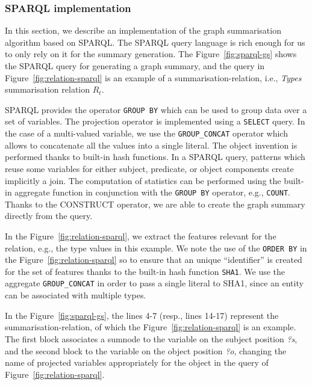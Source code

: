 \subsubsection{SPARQL implementation}

In this section, we describe an implementation of the graph summarisation algorithm based on SPARQL. The SPARQL query language is rich enough for us to only rely on it for the summary generation.
The Figure~\ref{fig:sparql-gs} shows the SPARQL query for generating a graph summary, and the query in Figure~\ref{fig:relation-sparql} is an example of a \gls{summarisation-relation}, i.e., \emph{Types} summarisation relation $R_t$.


SPARQL provides the operator \texttt{GROUP BY} which can be used to group data over a set of variables. The projection operator is implemented using a \texttt{SELECT} query. In the case of a multi-valued variable, we use the \texttt{GROUP\_CONCAT} operator which allows to concatenate all the values into a single literal. The object invention is performed thanks to built-in hash functions. In a SPARQL query, patterns which reuse some variables for either subject, predicate, or object components create implicitly a join. The computation of statistics can be performed using the built-in aggregate function in conjunction with the \texttt{GROUP BY} operator, e.g., \texttt{COUNT}. Thanks to the CONSTRUCT operator, we are able to create the graph summary directly from the query.


In the Figure~\ref{fig:relation-sparql}, we extract the features relevant for the relation, e.g., the type values in this example. We note the use of the \texttt{ORDER BY} in the Figure~\ref{fig:relation-sparql} so to ensure that an unique ``identifier'' is created for the set of features thanks to the built-in hash function \texttt{SHA1}. We use the aggregate \texttt{GROUP\_CONCAT} in order to pass a single literal to SHA1, since an entity can be associated with multiple types.


In the Figure~\ref{fig:sparql-gs}, the lines 4-7 (resp., lines 14-17) represent the \gls{summarisation-relation}, of which the Figure~\ref{fig:relation-sparql} is an example. The first block associates a sumnode to the variable on the subject position \emph{?s}, and the second block to the variable on the object position \emph{?o}, changing the name of projected variables appropriately for the object in the query of Figure~\ref{fig:relation-sparql}.

